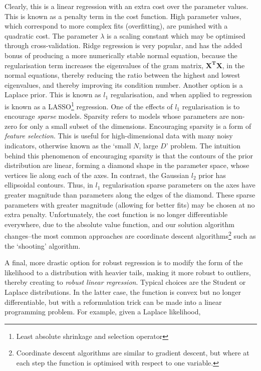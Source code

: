 \documentclass[11pt]{amsart}
\begin{document}
Clearly, this is a linear regression with an extra cost over the parameter values. This is known as a penalty term in the cost function. High parameter values, which correspond to more complex fits (overfitting), are punished with a quadratic cost. The parameter $\lambda$ is a scaling constant which may be optimised through cross-validation. Ridge regression is very popular, and has the added bonus of producing a more numerically stable normal equation, because the regularisation term increases the eigenvalues of the gram matrix, $\mathbf{X^T}\mathbf{X}$, in the normal equations, thereby reducing the ratio between the highest and lowest eigenvalues, and thereby improving its condition number. Another option is a Laplace prior. This is known as $l_1$ regularisation, and when applied to regression is known as a LASSO\footnote{Least absolute shrinkage and selection operator} regression. One of the effects of $l_1$ regularisation is to encourage \emph{sparse} models. Sparsity refers to models whose parameters are non-zero for only a small subset of the dimensions. Encouraging sparsity is a form of \emph{feature selection}. This is useful for high-dimensional data with many noisy indicators, otherwise known as the `small $N$, large $D$' problem. The intuition behind this phenomenon of encouraging sparsity is that the contours of the prior distribution are linear, forming a diamond shape in the parameter space, whose vertices lie along each of the axes. In contrast, the Gaussian $l_2$ prior has ellipsoidal contours. Thus, in $l_1$ regularisation sparse parameters on the axes have greater magnitude than parameters along the edges of the diamond. These sparse parameters with greater magnitude (allowing for better fits) may be chosen at no extra penalty. Unfortunately, the cost function is no longer differentiable everywhere, due to the absolute value function, and our solution algorithm changes--the most common approaches are coordinate descent algorithms\footnote{Coordinate descent algorithms are similar to gradient descent, but where at each step the function is optimised with respect to one variable.} such as the `shooting' algorithm.

A final, more drastic option for robust regression is to modify the form of the likelihood to a distribution with heavier tails, making it more robust to outliers, thereby creating to \emph{robust linear regression}. Typical choices are the Student or Laplace distributions. In the latter case, the function is convex but no longer differentiable, but with a reformulation trick can be made into a linear programming problem. For example, given a Laplace likelihood,
\end{document}
